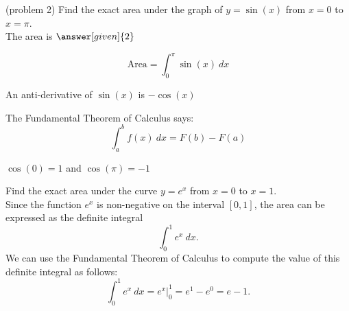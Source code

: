 \documentclass{ximera}
\begin{document}
\begin{problem}(problem 2)
Find the exact area under the graph of $y = \sin(x)$ from $x = 0$ to $x = \pi$.\\
The area is $\answer[given]{2}$

\begin{hint}
  \[
  \text{Area} = \int_0^{\pi} \sin(x) \ dx 
  \]
\end{hint}
    \begin{hint}
      An anti-derivative of $\sin(x)$ is $-\cos(x)$
    \end{hint}
    
    \begin{hint}
      The Fundamental Theorem of Calculus says:
      \[
      \int_a^b f(x) \ dx = F(b) - F(a)
      \]
    \end{hint}    
		\begin{hint}
      $\cos(0) = 1$ and $\cos(\pi) = -1$
    \end{hint}
		
\end{problem}


\begin{example}[example 3]
Find the exact area under the curve $y = e^x$ from $x = 0$ to $x = 1$.\\
Since the function $e^x$ is non-negative on the interval $[0, 1]$, the area can be expressed as the definite integral
\[\int_0^1 e^x \ dx.\]
We can use the Fundamental Theorem of Calculus to compute the value of this definite integral as follows:
\[\int_0^{1} e^x \ dx = e^x \Big|_0^{1} = e^{1} - e^0= e- 1.\]


\begin{image}
\end{image}

\end{example}
\end{document}
